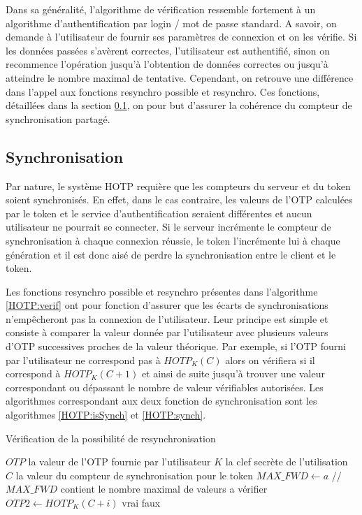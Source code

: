 \documentclass{../res/univ-projet}
\begin{document}
  Dans sa généralité, l'algorithme de vérification ressemble fortement à un algorithme d'authentification par login / mot de passe standard. A savoir, on demande à 
  l'utilisateur de fournir ses paramètres de connexion et on les vérifie. Si les données passées s'avèrent correctes, l'utilisateur est authentifié, sinon on recommence 
  l'opération jusqu'à l'obtention de données correctes ou jusqu'à atteindre le nombre maximal de tentative. Cependant, on retrouve une différence dans l'appel aux 
  fonctions \og{}resynchro possible\fg{} et \og{}resynchro\fg{}. Ces fonctions, détaillées dans la section \ref{HOTP:synchro}, on pour but d'assurer la cohérence du 
  compteur de synchronisation partagé.
  
  \subsection{Synchronisation}
  \label{HOTP:synchro}
  Par nature, le système HOTP requière que les compteurs du serveur et du token soient synchronisés. En effet, dans le cas contraire, les valeurs de l'OTP calculées par le 
  token et le service d'authentification seraient différentes et aucun utilisateur ne pourrait se connecter.  Si le serveur incrémente le compteur de synchronisation à 
  chaque connexion réussie, le token l'incrémente lui à chaque génération et il est donc aisé de perdre la synchronisation entre le client et le token.
  
  Les fonctions \og{}resynchro possible\fg{} et \og{}resynchro\fg{} présentes dans l'algorithme \ref{HOTP:verif} ont pour fonction d'assurer que les écarts de 
  synchronisations n'empêcheront pas la connexion de l'utilisateur. Leur principe est simple et consiste à comparer la valeur donnée par l'utilisateur avec plusieurs 
  valeurs d'OTP successives proches de la valeur théorique. Par exemple, si l'OTP fourni par l'utilisateur ne correspond pas à $HOTP_K(C)$ alors on vérifiera si il 
  correspond à $HOTP_K(C + 1)$ et ainsi de suite jusqu'à trouver une valeur correspondant ou dépassant le nombre de valeur vérifiables autorisées. Les algorithmes 
  correspondant aux deux fonction de synchronisation sont les algorithmes \ref{HOTP:isSynch} et \ref{HOTP:synch}.

  \begin{algorithm}
    \caption{Vérification de la possibilité de resynchronisation}
    \label{HOTP:isSynch}
    
    \begin{algorithmic}
      \REQUIRE $OTP$ la valeur de l'OTP fournie par l'utilisateur
      \REQUIRE $K$ la clef secrète de l'utilisation
      \REQUIRE $C$ la valeur du compteur de synchronisation pour le token
      \STATE $MAX\_FWD \leftarrow a$ //$MAX\_FWD$ contient le nombre maximal de valeurs a vérifier
        \STATE $OTP2 \leftarrow HOTP_K(C + i)$
          \RETURN vrai
        \ENDIF
      \ENDFOR
      \RETURN faux
    \end{algorithmic}
  \end{algorithm}
  
\end{document}
